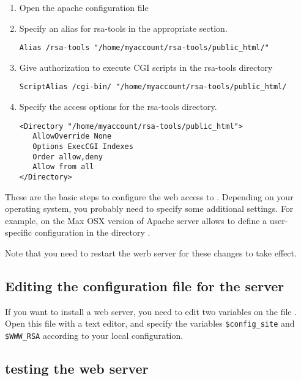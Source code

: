 \documentclass{article}
\begin{document}
\begin{enumerate}
\item Open the apache configuration file 

\item Specify an alias for rsa-tools in the appropriate section.

\begin{verbatim}
Alias /rsa-tools "/home/myaccount/rsa-tools/public_html/"
\end{verbatim}

\item Give authorization to execute CGI scripts in the rsa-tools directory

\begin{verbatim}
ScriptAlias /cgi-bin/ "/home/myaccount/rsa-tools/public_html/
\end{verbatim}

\item Specify the access options for the rsa-tools directory.

\begin{verbatim}
<Directory "/home/myaccount/rsa-tools/public_html">
   AllowOverride None
   Options ExecCGI Indexes
   Order allow,deny
   Allow from all
</Directory>
\end{verbatim}

\end{enumerate}

These are the basic steps to configure the web access to
\RSAT. Depending on your operating system, you probably need to
specify some additional settings. For example, on the Max OSX version
of Apache server allows to define a user-specific configuration in the
directory .

Note that you need to restart the werb server for these changes to
take effect.

\subsection{Editing the configuration file for the server}

If you want to install a web server, you need to edit two variables on
the file . Open this file with a text editor, and
specify the variables \texttt{\$config\_site} and \texttt{\$WWW\_RSA}
according to your local configuration.

\subsection{testing the web server}
\end{document}

